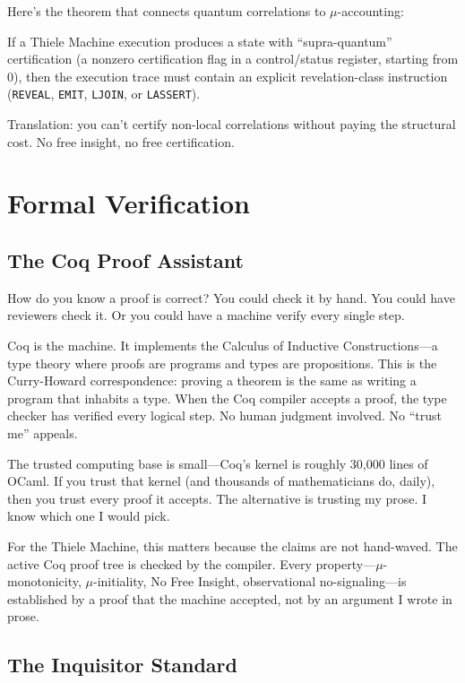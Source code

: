 Here's the theorem that connects quantum correlations to $\mu$-accounting:

\begin{theorem}
If a Thiele Machine execution produces a state with ``supra-quantum'' certification (a nonzero certification flag in a control/status register, starting from 0), then the execution trace must contain an explicit revelation-class instruction (\texttt{REVEAL}, \texttt{EMIT}, \texttt{LJOIN}, or \texttt{LASSERT}).
\end{theorem}

Translation: you can't certify non-local correlations without paying the structural cost. No free insight, no free certification.

\section{Formal Verification}

\subsection{The Coq Proof Assistant}

How do you know a proof is correct? You could check it by hand. You could have reviewers check it. Or you could have a machine verify every single step.

Coq is the machine. It implements the Calculus of Inductive Constructions---a type theory where proofs are programs and types are propositions. This is the Curry-Howard correspondence: proving a theorem is the same as writing a program that inhabits a type. When the Coq compiler accepts a proof, the type checker has verified every logical step. No human judgment involved. No ``trust me'' appeals.

The trusted computing base is small---Coq's kernel is roughly 30,000 lines of OCaml. If you trust that kernel (and thousands of mathematicians do, daily), then you trust every proof it accepts. The alternative is trusting my prose. I know which one I would pick.

For the Thiele Machine, this matters because the claims are not hand-waved. The active Coq proof tree is checked by the compiler. Every property---$\mu$-monotonicity, $\mu$-initiality, No Free Insight, observational no-signaling---is established by a proof that the machine accepted, not by an argument I wrote in prose.

\subsection{The Inquisitor Standard}

